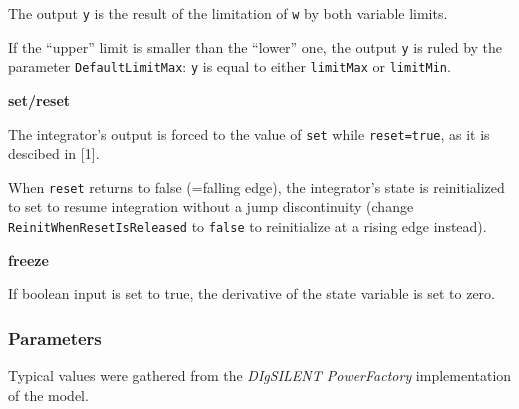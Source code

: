 \documentclass[
  a4paper,
  DIV=11,
  numbers=noendperiod]{scrartcl}
\begin{document}
The output \texttt{y} is the result of the limitation of \texttt{w} by
both variable limits.

If the ``upper'' limit is smaller than the ``lower'' one, the output
\texttt{y} is ruled by the parameter \texttt{DefaultLimitMax}:
\texttt{y} is equal to either \texttt{limitMax} or \texttt{limitMin}.

\textbf{set/reset}

The integrator's output is forced to the value of \texttt{set} while
\texttt{reset=true}, as it is descibed in {[}1{]}.

When \texttt{reset} returns to false (=falling edge), the integrator's
state is reinitialized to set to resume integration without a jump
discontinuity (change \texttt{ReinitWhenResetIsReleased} to
\texttt{false} to reinitialize at a rising edge instead).

\textbf{freeze}

If boolean input is set to true, the derivative of the state variable is
set to zero.

\subsubsection{Parameters}\label{sec-wt-p-params}

Typical values were gathered from the \emph{DIgSILENT PowerFactory}
implementation of the model.
\end{document}
